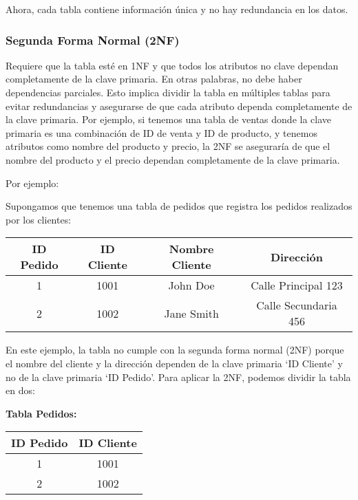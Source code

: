 \documentclass[executivepaper]{article}
\begin{document}
Ahora, cada tabla contiene información única y no hay redundancia en los datos.

\subsubsection*{Segunda Forma Normal (2NF)}

Requiere que la tabla esté en 1NF y que todos los atributos no clave dependan completamente de la clave primaria. En otras palabras, no debe haber dependencias parciales. Esto implica dividir la tabla en múltiples tablas para evitar redundancias y asegurarse de que cada atributo dependa completamente de la clave primaria. Por ejemplo, si tenemos una tabla de ventas donde la clave primaria es una combinación de ID de venta y ID de producto, y tenemos atributos como nombre del producto y precio, la 2NF se aseguraría de que el nombre del producto y el precio dependan completamente de la clave primaria.

Por ejemplo:

Supongamos que tenemos una tabla de pedidos que registra los pedidos realizados por los clientes:

\begin{center}
\begin{tabular}{|c|c|c|c|}
\hline
\textbf{ID Pedido} & \textbf{ID Cliente} & \textbf{Nombre Cliente} & \textbf{Dirección} \\
\hline
1 & 1001 & John Doe & Calle Principal 123 \\
\hline
2 & 1002 & Jane Smith & Calle Secundaria 456 \\
\hline
\end{tabular}
\end{center}

En este ejemplo, la tabla no cumple con la segunda forma normal (2NF) porque el nombre del cliente y la dirección dependen de la clave primaria \enquote*{ID Cliente} y no de la clave primaria \enquote*{ID Pedido}. Para aplicar la 2NF, podemos dividir la tabla en dos:

\textbf{Tabla Pedidos:}
\begin{center}
\begin{tabular}{|c|c|}
\hline
\textbf{ID Pedido} & \textbf{ID Cliente} \\
\hline
1 & 1001 \\
\hline
2 & 1002 \\
\hline
\end{tabular}
\end{center}
\end{document}
